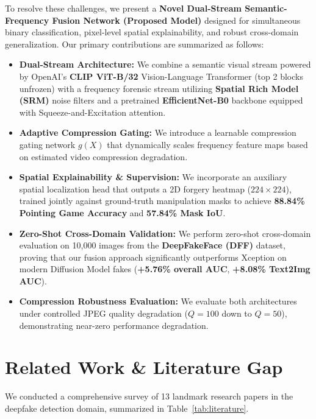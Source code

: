 \documentclass[10pt,conference]{IEEEtran}
\begin{document}
To resolve these challenges, we present a \textbf{Novel Dual-Stream Semantic-Frequency Fusion Network (Proposed Model)} designed for simultaneous binary classification, pixel-level spatial explainability, and robust cross-domain generalization. Our primary contributions are summarized as follows:
\begin{itemize}
    \item \textbf{Dual-Stream Architecture:} We combine a semantic visual stream powered by OpenAI's \textbf{CLIP ViT-B/32} Vision-Language Transformer (top 2 blocks unfrozen) with a frequency forensic stream utilizing \textbf{Spatial Rich Model (SRM)} noise filters and a pretrained \textbf{EfficientNet-B0} backbone equipped with Squeeze-and-Excitation attention.
    \item \textbf{Adaptive Compression Gating:} We introduce a learnable compression gating network $g(X)$ that dynamically scales frequency feature maps based on estimated video compression degradation.
    \item \textbf{Spatial Explainability \& Supervision:} We incorporate an auxiliary spatial localization head that outputs a 2D forgery heatmap ($224 \times 224$), trained jointly against ground-truth manipulation masks to achieve \textbf{88.84\% Pointing Game Accuracy} and \textbf{57.84\% Mask IoU}.
    \item \textbf{Zero-Shot Cross-Domain Validation:} We perform zero-shot cross-domain evaluation on 10,000 images from the \textbf{DeepFakeFace (DFF)} dataset, proving that our fusion approach significantly outperforms Xception on modern Diffusion Model fakes (\textbf{+5.76\% overall AUC}, \textbf{+8.08\% Text2Img AUC}).
    \item \textbf{Compression Robustness Evaluation:} We evaluate both architectures under controlled JPEG quality degradation ($Q=100$ down to $Q=50$), demonstrating near-zero performance degradation.
\end{itemize}

\section{Related Work \& Literature Gap}\label{sec:related}
We conducted a comprehensive survey of 13 landmark research papers in the deepfake detection domain, summarized in Table~\ref{tab:literature}.
\end{document}
